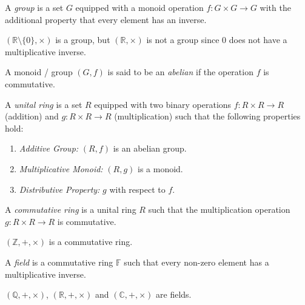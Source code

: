 \documentclass[
	11pt, %
	fleqn, %
	a4paper, %
]{LegrandOrangeBook}
\newcommand{\F}{\mathbb{F}} %
\begin{document}
\begin{definition}[Group]
    A \emph{group} is a set $G$ equipped with a monoid operation $f: G \times G \to G$ with the additional property that every element has an inverse.
\end{definition}

\begin{example}
    $(\mathbb{R}\setminus\{0\}, \times)$ is a group, but $(\mathbb{R}, \times)$ is not a group since $0$ does not have a multiplicative inverse.
\end{example}

\begin{definition}
    A monoid / group $(G, f)$ is said to be an \emph{abelian} if the operation $f$ is commutative.
\end{definition}

\begin{definition}
    A \emph{unital ring} is a set $R$ equipped with two binary operations $f: R \times R \to R$ (addition) and $g: R \times R \to R$ (multiplication) such that the following properties hold:
    \begin{enumerate}
        \item \emph{Additive Group:} $(R, f)$ is an abelian group.
        \item \emph{Multiplicative Monoid:} $(R, g)$ is a monoid.
        \item \emph{Distributive Property:} $g$ with respect to $f$.
    \end{enumerate}
\end{definition}

\begin{definition}
    A \emph{commutative ring} is a unital ring $R$ such that the multiplication operation $g: R \times R \to R$ is commutative.
\end{definition}

\begin{example}
    $(\mathbb{Z}, +, \times)$ is a commutative ring.
\end{example}

\begin{definition}[Field]
    A \emph{field} is a commutative ring $\F$ such that every non-zero element has a multiplicative inverse.
\end{definition}

\begin{example}
    $(\mathbb{Q}, +, \times)$, $(\mathbb{R}, +, \times)$ and $(\mathbb{C}, +, \times)$ are fields.
\end{example}
\end{document}
